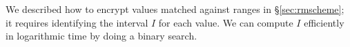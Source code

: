 We described how to encrypt values matched against ranges in \S\ref{sec:rmscheme}; it requires identifying the interval $I$ for each value. We can compute $I$ efficiently in logarithmic time by doing a binary search. 



%
%
%




